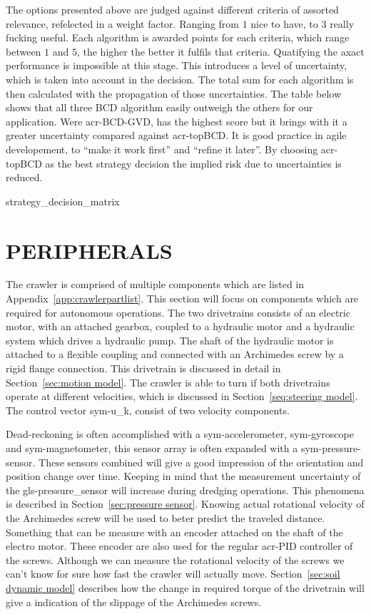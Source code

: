 The options presented above are judged against different criteria of assorted relevance, refelected in a weight factor.
Ranging from \( 1 \) nice to have, to \(  3 \) really fucking useful. Each algorithm is awarded points for each
criteria, which range between \( 1 \) and \( 5 \), the higher the better it fulfils that criteria. Quatifying the axact
performance is impossible at this stage. This introduces a level of uncertainty, which is taken into account in the
decision. The total sum for each algorithm is then calculated with the propagation of those uncertainties. The table
below shows that all three BCD algorithm easily outweigh the others for our application. Were \gls{acr-BCD-GVD}, has the
highest score but it brings with it a greater uncertainty compared against \gls{acr-topBCD}. It is good practice in
agile developement, to ``make it work first'' and ``refine it later''. By choosing \gls{acr-topBCD} as the best strategy
decision the implied risk due to uncertainties is reduced.

{strategy_decision_matrix}

\section{PERIPHERALS}\label{sec:peripherals}

The crawler is comprised of multiple components which are listed in Appendix~\ref{app:crawlerpartlist}. This section
will focus on components which are required for autonomous operations. The two drivetrains consists of an electric
motor, with an attached gearbox, coupled to a hydraulic motor and a hydraulic system which drives a hydraulic pump. The
shaft of the hydraulic motor is attached to a flexible coupling and connected with an Archimedes screw by a rigid flange
connection. This drivetrain is discussed in detail in Section~\ref{sec:motion model}. The crawler is able to turn if
both drivetrains operate at different velocities, which is discussed in Section~\ref{seq:steering model}. The control
vector \gls{sym-u_k}, consist of two velocity components.

Dead-reckoning is often accomplished with a \gls{sym-accelerometer}, \gls{sym-gyroscope} and \gls{sym-magnetometer},
this sensor array is often expanded with a \gls{sym-pressure-sensor}. These sensors combined will give a good impression
of the orientation and position change over time. Keeping in mind that the measurement uncertainty of the
\gls{gls-pressure_sensor} will increase during dredging operations. This phenomena is described in
Section~\ref{sec:pressure sensor}. Knowing actual rotational velocity of the Archimedes screw will be used to beter
predict the traveled distance. Something that can be measure with an encoder attached on the shaft of the electro motor.
These encoder are also used for the regular \gls{acr-PID} controller of the screws. Although we can measure the
rotational velocity of the screws we can't know for sure how fast the crawler will actually move. Section~\ref{sec:soil
dynamic model} describes how the change in required torque of the drivetrain will give a indication of the slippage of
the Archimedes screws.

